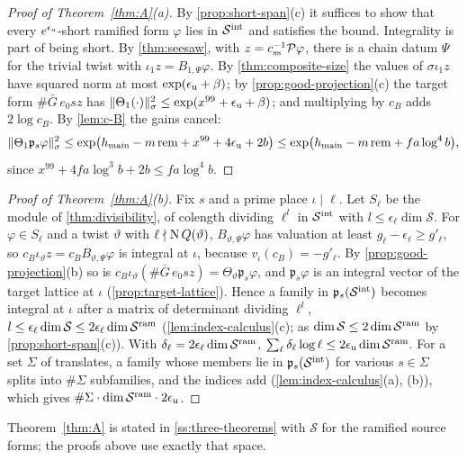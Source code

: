 \begin{proof}[Proof of Theorem~\textup{\ref{thm:A}}(a)]
By \cref{prop:short-span}(c) it suffices to show that every $e^{\epsilon_{\mathrm{u}}}$-short ramified form $\varphi$ lies in $\mathcal S^{\rm int}$ and satisfies the bound. Integrality
is part of being short. By \cref{thm:seesaw}, with $z=c_{\rm ss}^{-1}\mathcal P\varphi$, there is a chain datum $\Psi$ for the trivial twist with $\iota_1z=B_{1,\Psi}\varphi$. By
\cref{thm:composite-size} the values of $\sigma\iota_1z$ have squared norm at most $\exp(\epsilon_{\mathrm{u}}+\beta)$; by \cref{prop:good-projection}(c) the target form
$\#\bar G\,e_0sz$ has $\lVert \Theta_1(\cdot)\rVert^2_\sigma\le\exp(x^{99}+\epsilon_{\mathrm{u}}+\beta)$; and multiplying by $c_B$ adds $2\log c_B$. By \cref{lem:c-B} the gains cancel:
\[
  \lVert \Theta_1\mathfrak p_s\varphi\rVert^2_\sigma\le\exp\bigl(h_{\mathrm{main}}-m\,\mathrm{rem}+x^{99}+4\epsilon_{\mathrm{u}}+2b\bigr)\le\exp\bigl(h_{\mathrm{main}}-m\,\mathrm{rem}+fa\log^4b\bigr),
\]
since $x^{99}+4fa\log^3b+2b\le fa\log^4b$.
\end{proof}

\begin{proof}[Proof of Theorem~\textup{\ref{thm:A}}(b)]
Fix $s$ and a prime place $\iota\mid\ell$. Let $S_\ell$ be the module of \cref{thm:divisibility}, of colength dividing $\ell^l$ in $\mathcal S^{\rm int}$ with $l\le\epsilon_\ell\dim\mathcal S$.
For $\varphi\in S_\ell$ and a twist $\vartheta$ with $\ell\nmid\operatorname{N} Q(\vartheta)$, $B_{\vartheta,\Psi}\varphi$ has valuation at least $g_\ell-\epsilon_\ell\ge g'_\ell$, so
$c_B\iota_\vartheta z=c_BB_{\vartheta,\Psi}\varphi$ is integral at $\iota$, because $v_\iota(c_B)=-g'_\ell$. By \cref{prop:good-projection}(b) so is
$c_B\iota_\vartheta(\#\bar G\,e_0sz)=\Theta_\vartheta\mathfrak p_s\varphi$, and $\mathfrak p_s\varphi$ is an integral vector of the target lattice at $\iota$ (\cref{prop:target-lattice}). Hence a family
in $\mathfrak p_s(\mathcal S^{\rm int})$ becomes integral at $\iota$ after a matrix of determinant dividing $\ell^l$, $l\le\epsilon_\ell\dim\mathcal S\le2\epsilon_\ell\dim\mathcal S^{\rm ram}$ (\cref{lem:index-calculus}(c); as
$\dim\mathcal S\le2\dim\mathcal S^{\rm ram}$ by \cref{prop:short-span}(c)). With $\delta_\ell=2\epsilon_\ell\dim\mathcal S^{\rm ram}$, $\sum_\ell\delta_\ell\log\ell\le2\epsilon_{\mathrm{u}}\dim\mathcal S^{\rm ram}$. For a set $\Sigma$
of translates, a family whose members lie in $\mathfrak p_s(\mathcal S^{\rm int})$ for various $s\in \Sigma$ splits into $\#\Sigma$ subfamilies, and the indices add (\cref{lem:index-calculus}(a), (b)), which gives
$\#\Sigma\cdot\dim\mathcal S^{\rm ram}\cdot2\epsilon_{\mathrm{u}}$.
\end{proof}


Theorem~\ref{thm:A} is stated in \cref{ss:three-theorems} with $\mathcal S$ for the ramified source forms; the proofs above use exactly that space.
